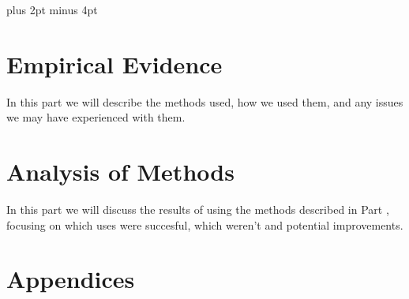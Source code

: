 \documentclass[a4paper,titlepage]{article}
\begin{document}
\parindent=0pt %
\parskip=8pt plus 2pt minus 4pt

\setcounter{page}{1}

\tableofcontents
\newpage

\begin{spacing}{1.15}


\pagebreak

\pagebreak

\part{Empirical Evidence}
\label{chap:Empiri}
In this part we will describe the methods used, how we used them, and any issues we may have experienced with them.






\pagebreak

\part{Analysis of Methods}
\label{chap:Analysis}
In this part we will discuss the results of using the methods described in Part \ref{chap:Empiri}, focusing on which uses were succesful, which weren't and potential improvements.






\pagebreak


\end{spacing}
\pagebreak


\newpage
\appendix
\part*{Appendices}


%
\end{document}
